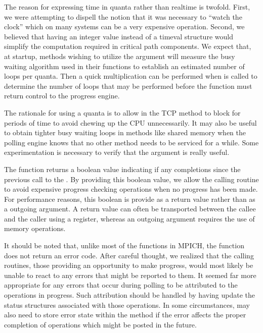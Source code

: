 The reason for expressing time in quanta rather than realtime is twofold.
First, we were attempting to dispell the notion that it was necessary to
``watch the clock'' which on many systems can be a very expensive operation.
Second, we believed that having an integer value instead of a timeval structure
would simplify the computation required in critical path components.  We expect
that, at startup, methods wishing to utilize the  argument will
measure the busy waiting algorithm used in their  functions to
establish an estimated number of loops per quanta.  Then a quick multiplication
can be performed when  is called to determine the number of loops
that may be performed before the  function must return control to
the progress engine.

\begin{discussion}
  The rationale for using a quanta is to allow  in the TCP
  method to block for periods of time to avoid chewing up the CPU
  unnecessarily.  It may also be useful to obtain tighter busy waiting loops in
  methods like shared memory when the polling engine knows that no other method
  needs to be serviced for a while.  Some experimentation is necessary to
  verify that the  argument is really useful.
\end{discussion}

The  function returns a boolean value indicating if any
completions since the previous call to the .  By providing
this boolean value, we allow the calling routine to avoid expensive progress
checking operations when no progress has been made.  For performance reasons,
this boolean is provide as a return value rather than as a outgoing argument.
A return value can often be transported between the callee and the caller using
a register, whereas an outgoing argument requires the use of memory operations.

It should be noted that, unlike most of the functions in MPICH, the
 function does not return an error code.  After careful
thought, we realized that the calling routines, those providing an opportunity
to make progress, would most likely be unable to react to any errors that might
be reported to them.  It seemed far more appropriate for any errors that occur
during polling to be attributed to the operations in progress.  Such
attribution should be handled by having  update the status
structures associated with those operations.  In some circumstances,
 may also need to store error state within the method if the
error affects the proper completion of operations which might be posted in the
future.

